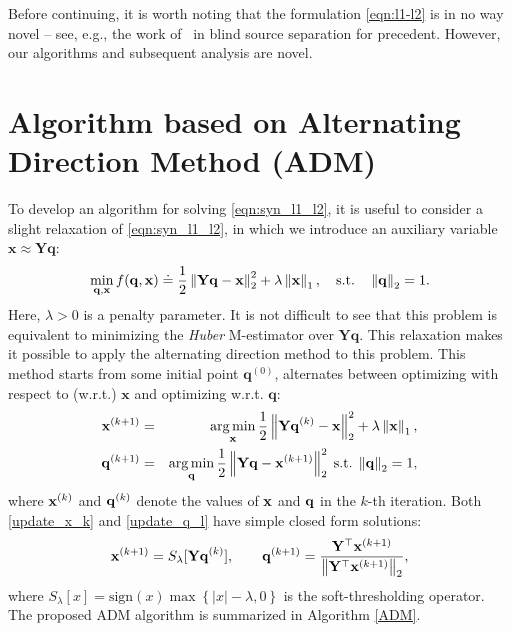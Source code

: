 \documentclass[11pt, journal, final]{IEEEtran}
\numberwithin{equation}{section}
\newcommand{\mb}{\mathbf}
\newcommand{\norm}[1]{\left\lVert#1\right\rVert}
\newcommand{ \abs }[1]{\left| #1 \right|}
\newcommand{ \brac }[1]{\left[ #1 \right]}
\begin{document}
{Before continuing, it is worth noting that the formulation \eqref{eqn:l1-l2} is in no way novel -- see, e.g., the work of~\cite{zibulevsky2001blind} in blind source separation for precedent. However, our algorithms and subsequent analysis are novel.

\section{Algorithm based on Alternating Direction Method (ADM)}\label{sec:algorithm}
To develop an algorithm for solving \eqref{eqn:syn_l1_l2}, it is useful to consider a slight relaxation of \eqref{eqn:syn_l1_l2}, in which we introduce an auxiliary variable $\mb x \approx \mb Y \mb q$:
\begin{equation} \label{eqn:huber-l2}
\min_{ {\bf q}, {\bf x} } f(\mb q,\mb x) \doteq \frac{1}{2}\norm{{\bf Yq} - {\bf x}}_2^2+\lambda \norm{\bf x}_1,\quad\text{s.t.}\quad \norm{\bf q}_2=1.
\end{equation}
Here, $\lambda > 0$ is a penalty parameter. It is not difficult to see that this problem is equivalent to minimizing the {\em Huber} M-estimator over $\mb Y \mb q$. This relaxation makes it possible to apply the alternating direction method to this problem. This method starts from some initial point $\mb q^{(0)}$, alternates between optimizing with respect to (w.r.t.) $\mb x$ and optimizing w.r.t. $\mb q$:
\begin{eqnarray}
{\bf x}^{(k+1)} &=& \mathop{\arg\min}_{\mb x} \frac{1}{2}\norm{{\bf Yq}^{(k)}-{\bf x}}_2^2 + \lambda\norm{\bf x}_1, \label{update_x_k}\\
{\bf q}^{(k+1)} &=& \mathop{\arg\min}_{\mb q} \frac{1}{2}\norm{{\bf Yq} - {\bf x}^{(k+1)}}_2^2 \; \text{s.t.} \; \norm{\mb q}_2 = 1,  \label{update_q_l}
\end{eqnarray}
where ${\bf x}^{(k)}$ and ${\bf q}^{(k)}$ denote the values of ${\bf x}$ and ${\bf q}$ in the $k$-th iteration.
Both \eqref{update_x_k} and \eqref{update_q_l} have simple closed form solutions:
\begin{eqnarray}
{\bf x}^{(k+1)} = S_{\lambda}[{\bf Yq}^{(k)}],\qquad {\bf q}^{(k+1)} = \frac{{\bf Y}^\top{\bf x}^{(k+1)}}{\norm{{\bf Y}^\top{\bf x}^{(k+1)}}_2},\label{eqn:closed-form}
\end{eqnarray}
where $S_{\lambda}\brac{x} = \mathrm{sign}(x)\max\left\{\abs{x} - \lambda,0\right\} $ is the soft-thresholding operator. The proposed ADM algorithm is summarized in Algorithm \ref{ADM}.

}
\end{document}
